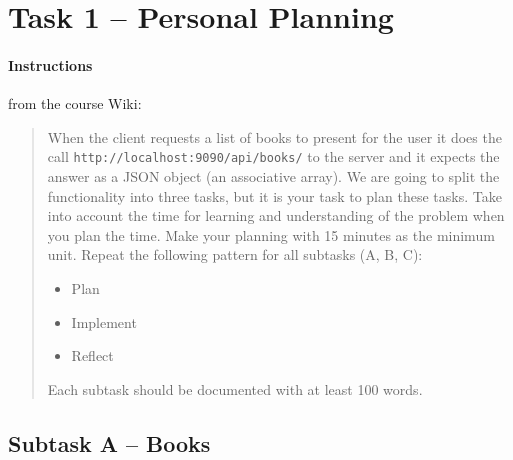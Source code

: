 %
%
%
%


\section{Task 1 -- Personal Planning}
\paragraph{Instructions}\label{task-1-instructions}
from the course Wiki\cite{1dv600:lab1:instructions}:

\begin{quote}
  When the client requests a list of books to present for the user it does the
  call \texttt{http://localhost:9090/api/books/} to the server and it expects
  the answer as a JSON object (an associative array). We are going to split the
  functionality into three tasks, but it is your task to plan these tasks. Take
  into account the time for learning and understanding of the problem when you
  plan the time. Make your planning with 15 minutes as the minimum unit. Repeat
  the following pattern for all subtasks (A, B, C):

  \begin{itemize}
    \item Plan
    \item Implement
    \item Reflect
  \end{itemize}

  Each subtask should be documented with at least 100 words.
\end{quote}


\subsection{Subtask A -- Books}\label{task-1a}
